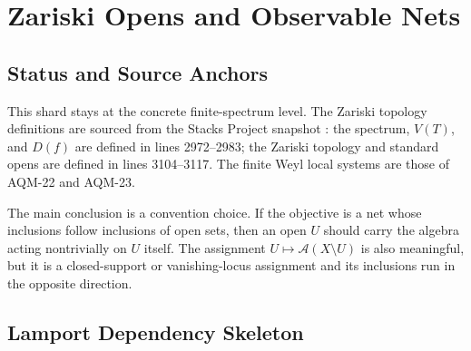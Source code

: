 
\section{Zariski Opens and Observable Nets}
\label{sec:zariski-opens-observable-nets}

\subsection{Status and Source Anchors}

This shard stays at the concrete finite-spectrum level.  The Zariski topology
definitions are sourced from the Stacks Project snapshot
: the spectrum,
\(V(T)\), and \(D(f)\) are defined in lines 2972--2983; the Zariski topology
and standard opens are defined in lines 3104--3117.  The finite Weyl local
systems are those of AQM-22 and AQM-23.

The main conclusion is a convention choice.  If the objective is a net whose
inclusions follow inclusions of open sets, then an open \(U\) should carry the
algebra acting nontrivially on \(U\) itself.  The assignment
\(U\mapsto\mathcal A(X\setminus U)\) is also meaningful, but it is a
closed-support or vanishing-locus assignment and its inclusions run in the
opposite direction.

\subsection{Lamport Dependency Skeleton}

